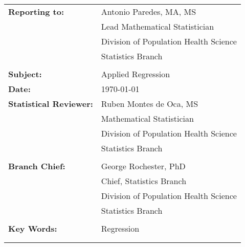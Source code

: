 \documentclass[letterpaper,11pt]{article}
\begin{document}
\begin{tabular}[h!]{p{2in} p{10in}}
	\rule{0pt}{4ex}\textbf{Reporting to:}          & Antonio Paredes, MA, MS  \\
																							   & Lead Mathematical Statistician \\
																							   & Division of Population Health Science \\
                                                 & Statistics Branch \\
																							   & \\
	\rule{0pt}{4ex}\textbf{Subject:}               & Applied Regression \\
	\rule{0pt}{4ex}\textbf{Date:}                  & \today \\
	\rule{0pt}{4ex}\textbf{Statistical Reviewer:}  & Ruben Montes de Oca, MS \\
																							   & Mathematical Statistician \\
																							   & Division of Population Health Science \\
                                                 & Statistics Branch \\
																							   & \\
	\rule{0pt}{4ex}\textbf{Branch Chief:}          & George Rochester, PhD \\
																							   & Chief, Statistics Branch \\
																							   & Division of Population Health Science \\
                                                 & Statistics Branch \\
                                                 & \\
	\rule{0pt}{4ex}\textbf{Key Words:}  					 & Regression \\
 \mbox{$\quad$} \\
 \mbox{$\quad$} \\
\end{tabular}

\newpage
\noindent 


\end{document}
